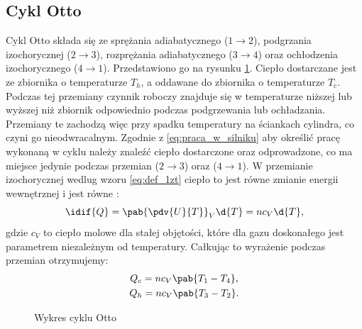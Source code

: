 \subsection{Cykl Otto}
Cykl Otto składa się ze sprężania adiabatycznego (\(1 \rightarrow 2\)), podgrzania izochorycznej (\(2 \rightarrow 3\)), rozprężania adiabatycznego (\(3 \rightarrow 4\)) oraz ochłodzenia izochorycznego (\(4 \rightarrow 1\)). Przedstawiono go na rysunku \ref{fig:pv_silnik_otto}. Ciepło dostarczane jest ze zbiornika o temperaturze \(T_h\), a oddawane do zbiornika o temperaturze \(T_c\). Podczas tej przemiany czynnik roboczy znajduje się w temperaturze niższej lub wyższej niż zbiornik odpowiednio podczas podgrzewania lub ochładzania. Przemiany te zachodzą więc przy spadku temperatury na ściankach cylindra, co czyni go nieodwracalnym. Zgodnie z \eqref{eq:praca_w_silniku} aby określić pracę wykonaną w cyklu należy znaleźć ciepło dostarczone oraz odprowadzone, co ma miejsce jedynie podczas przemian (\(2 \rightarrow 3\)) oraz (\(4 \rightarrow 1\)). W przemianie izochorycznej wedlug wzoru \eqref{eq:def_1zt} ciepło to jest równe zmianie energii wewnętrznej i jest równe \cite{b:pudlik_termodynamika}:
\begin{equation}
	\idif{Q} = \pab{\pdv{U}{T}}_{V} \d{T} = n c_{V} \d{T},
\end{equation}
gdzie \(c_{V}\) to ciepło molowe dla stałej objętości, które dla gazu doskonałego jest parametrem niezależnym od temperatury. Całkując to wyrażenie podczas przemian otrzymujemy:
\begin{gather*}
	Q_c = n c_{V} \pab{T_1 - T_4}, \\
	Q_h = n c_{V} \pab{T_3 - T_2}.
\end{gather*}

\begin{figure}
	\centering
	
	\caption{Wykres cyklu Otto}
	\label{fig:pv_silnik_otto}
\end{figure}

